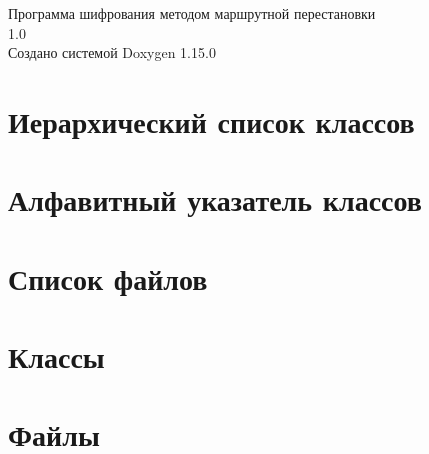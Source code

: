 \documentclass[twoside]{book}
\newcommand{\+}{\discretionary{\mbox{\scriptsize$\hookleftarrow$}}{}{}}
\newcommand{\clearemptydoublepage}{%
    \newpage{\pagestyle{empty}\cleardoublepage}%
  }
\begin{document}
  \raggedbottom
    \hypersetup{pageanchor=false,
                bookmarksnumbered=true,
                pdfencoding=unicode
               }
  \begin{titlepage}
  \vspace*{7cm}
  \begin{center}%
  {\Large Программа шифрования методом маршрутной перестановки}\\
  [1ex]\large 1.\+0 \\
  \vspace*{1cm}
  {\large Создано системой Doxygen 1.15.0}\\
  \end{center}
  \end{titlepage}
  \clearemptydoublepage
  \tableofcontents
  \clearemptydoublepage
  \hypersetup{pageanchor=true}

\chapter{Иерархический список классов}

\chapter{Алфавитный указатель классов}

\chapter{Список файлов}

\chapter{Классы}



\chapter{Файлы}





  \backmatter
  \newpage
  \clearemptydoublepage
  \printindex
\end{document}
